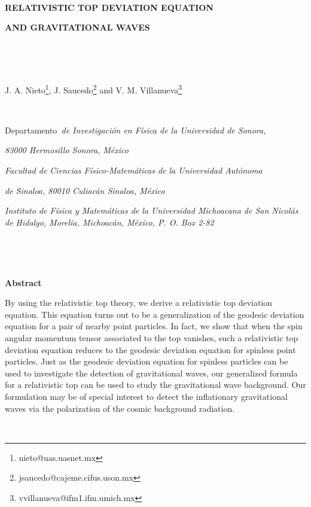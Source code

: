 \documentclass[a4paper,12pt]{article}
\begin{document}
\bigskip\ 

\begin{center}
\textbf{RELATIVISTIC TOP DEVIATION EQUATION }

\textbf{AND GRAVITATIONAL WAVES}

\bigskip\ 

\smallskip\ 

J. A. Nieto\myHighlight{$^{\ast }$}\coordHE{}\footnote{%
nieto@uas.uasnet.mx}, J. Saucedo\myHighlight{$^{\ddagger }$}\coordHE{}\footnote{%
jsaucedo@cajeme.cifus.uson.mx} and V. M. Villanueva\myHighlight{$^{\dagger }$}\coordHE{}\footnote{%
vvillanueva@ifm1.ifm.umich.mx}

\smallskip\ 

\myHighlight{$^{\ast \ddagger }$}\coordHE{}Departamento\textit{\ de Investigaci\'{o}n en F\'{i}sica
de la Universidad de Sonora,}

\textit{83000 Hermosillo Sonora, M\'{e}xico}

\myHighlight{$^{\ast }$}\coordHE{}\textit{Facultad de Ciencias F\'{i}sico-Matem\'{a}ticas de la
Universidad Aut\'{o}noma}

\textit{de Sinaloa, 80010 Culiac\'{a}n Sinaloa, M\'{e}xico}

\myHighlight{$^{\dagger }$}\coordHE{}\textit{Instituto de F\'{i}sica y Matem\'{a}ticas de la
Universidad Michoacana de San Nicol\'{a}s de Hidalgo, Morelia,
Michoac\'{a}n, M\'{e}xico, P. O. Box 2-82}

\textit{\ }

\bigskip\ 

\textbf{Abstract}
\end{center}

By using the relativistic top theory, we derive a relativistic top deviation
equation. This equation turns out to be a generalization of the geodesic
deviation equation for a pair of nearby point particles. In fact, we show
that when the spin angular momentum tensor associated to the top vanishes,
such a relativistic top deviation equation reduces to the geodesic deviation
equation for spinless point particles. Just as the geodesic deviation
equation for spinless particles can be used to investigate the detection of
gravitational waves, our generalized formula for a relativistic top can be
used to study the gravitational wave background. Our formulation may be of
special interest to detect the inflationary gravitational waves via the
polarization of the cosmic background radiation.

\bigskip\ 
\end{document}
